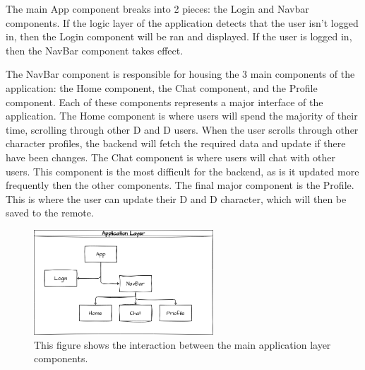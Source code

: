 \documentclass{article}
\begin{document}
	The main App component breaks into 2 pieces: the Login and Navbar components. If the logic layer
	of the application detects that the user isn't logged in, then the Login component will be ran and
	displayed. If the user is logged in, then the NavBar component takes effect. 

	The NavBar component is responsible for housing the 3 main components of the application: the Home
	component, the Chat component, and the Profile component. Each of these components represents a
	major interface of the application. The Home component is where users will spend the majority of 
	their time, scrolling through other D and D users. When the user scrolls through other character
	profiles, the backend will fetch the required data and update if there have been changes. The Chat
	component is where users will chat with other users. This component is the most difficult for the
	backend, as is it updated more frequently then the other components. The final major component is
	the Profile. This is where the user can update their D and D character, which will then be saved 
	to the remote. 

	\begin{figure}[b]
		\centering
		\includegraphics[width=0.6\textwidth]{app-layer.png}
		\caption{This figure shows the interaction between the main application layer components.}
	\end{figure}

\end{document}
